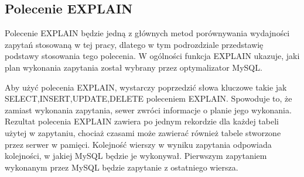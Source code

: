 \subsection{Polecenie EXPLAIN}
Polecenie EXPLAIN będzie jedną z głównych metod porównywania wydajności zapytań stosowaną w tej pracy, dlatego w tym podrozdziale przedstawię podstawy stosowania tego polecenia. W ogólności funkcja EXPLAIN ukazuje, jaki plan wykonania zapytania został wybrany przez optymalizator MySQL.

Aby użyć polecenia EXPLAIN, wystarczy poprzedzić słowa kluczowe takie jak SELECT,INSERT,UPDATE,DELETE poleceniem EXPLAIN. Spowoduje to, że zamiast wykonania zapytania, sewer zwróci informacje o planie jego wykonania. Rezultat polecenia EXPLAIN zawiera po jednym rekordzie dla każdej tabeli użytej w zapytaniu, chociaż czasami może zawierać również tabele stworzone przez serwer w pamięci. Kolejność wierszy w wyniku zapytania odpowiada kolejności, w jakiej MySQL będzie je wykonywał. Pierwszym zapytaniem wykonanym przez MySQL będzie zapytanie z ostatniego wiersza.

